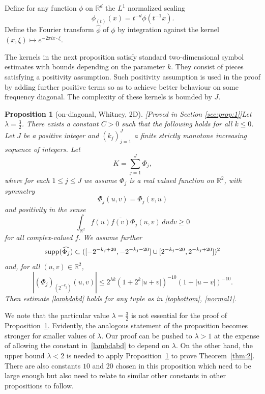 \documentclass[12pt,reqno]{amsart}
\theoremstyle{plain}
\newtheorem{proposition}[theorem]{Proposition}
\theoremstyle{definition}
\numberwithin{equation}{section}
\newcommand{\R}{{\mathbb R}}
\begin{document}
Define for any function $\phi$ on $\R^d$ the $L^1$ normalized scaling
\begin{equation*}%
\phi_{(t)}(x)=t^{-d} \phi(t^{-1}x).
\end{equation*}
Define the Fourier transform $\widehat{\phi}$ of  $\phi$ 
by integration against the kernel $(x,\xi) \mapsto e^{-2\pi i x \cdot \xi}$.

The kernels in the next proposition satisfy standard two-dimensional symbol estimates with bounds depending on the parameter $k$.
They consist of pieces satisfying a positivity assumption.
Such positivity assumption is used in the proof by adding further
positive terms so as to achieve better behaviour on some frequency diagonal.
The complexity of these kernels is bounded by $J$.

\begin{proposition}[on-diagonal, Whitney, 2D][Proved in Section \ref{sec:prop:1}]\label{prop:1}
Let $\lambda=\frac{3}{2}$.
There exists a constant $C>0$ such that the following holds for all $k \leq 0$. 
Let $J$ be a positive integer and   $(k_j)_{j=1}^J$ 
  a finite strictly monotone increasing sequence of integers.
Let
\[K =\sum_{j=1}^J \Phi_j,\]
where for each $1\le j\le J$ we assume 
$\Phi_j$ is a real valued  function on $\R^2$,
with symmetry $$\Phi_j(u,v)=\Phi_j(v,u)$$ and positivity
in the sense
\begin{equation}\label{poskernel}
\int_{\R^2} f(u)\overline{f(v)}\Phi_j(u,v)\,dudv\ge 0
\end{equation}
for all complex-valued $f$.
We assume further
\begin{equation*}%
{\rm supp} (\widehat{\Phi_j})\subset 
([-2^{-k_j+20},-2^{-k_j-20}]\cup [2^{-k_j-20},2^{-k_j+20}])^2
\end{equation*}  
and, for all $(u,v)\in \R^2$,
\begin{equation}\label{E:phi-lambda}
 |(\Phi_j)_{(2^{-k_j})}(u, v)| \leq  2^{\lambda k}(1+2^k|u+v|)^{-10} (1+|u-v|)^{-10}.
\end{equation}
Then estimate \eqref{lambdabd} holds for any tuple as in \eqref{topbottom}, \eqref{normal1}.
\end{proposition}

We note that the particular value $\lambda=\frac{3}{2}$ is not essential for the proof of Proposition~\ref{prop:1}. Evidently, the analogous statement of the proposition becomes stronger for smaller values of $\lambda$. Our proof can be pushed 
to $\lambda>1$ at the expense of allowing the constant in~\eqref{lambdabd} to depend on $\lambda$. On the other hand, the upper bound $\lambda<2$ is needed to apply Proposition~\ref{prop:1} to prove Theorem~\ref{thm:2}.
There are also constants $10$ and $20$ chosen in this proposition which need to be large enough but
also need to relate to similar other constants in other propositions to follow.
\end{document}
